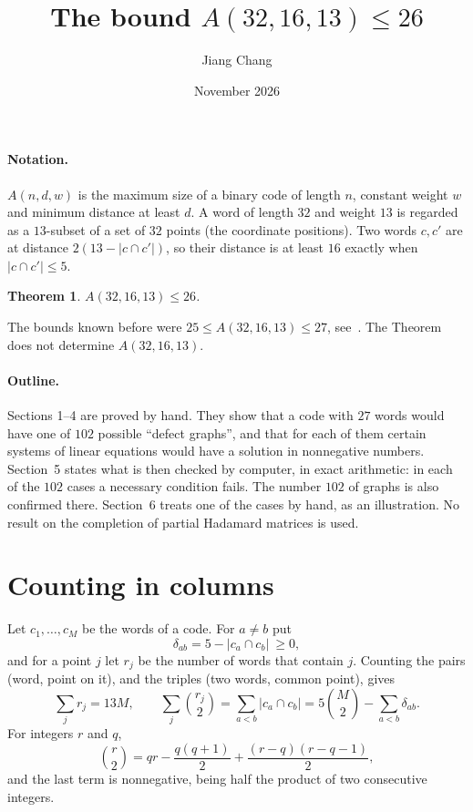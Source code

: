 \documentclass[11pt,a4paper]{article}
\title{\large\bfseries The bound $A(32,16,13)\le 26$}
\author{Jiang Chang}
\date{November 2026}
\newtheorem*{theorem}{Theorem}
\newcommand{\abs}[1]{\lvert #1\rvert}
\begin{document}
\maketitle

\paragraph{Notation.}
$A(n,d,w)$ is the maximum size of a binary code of length $n$, constant
weight $w$ and minimum distance at least $d$. A word of length $32$ and
weight $13$ is regarded as a $13$-subset of a set of $32$ points (the
coordinate positions). Two words $c,c'$ are at distance
$2(13-\abs{c\cap c'})$, so their distance is at least $16$ exactly when
$\abs{c\cap c'}\le 5$.

\begin{theorem}
$A(32,16,13)\le 26$.
\end{theorem}

The bounds known before were $25\le A(32,16,13)\le 27$, see~\cite{Btab}.
The Theorem does not determine $A(32,16,13)$.

\paragraph{Outline.}
Sections 1--4 are proved by hand. They show that a code with $27$ words
would have one of $102$ possible ``defect graphs'', and that for each of
them certain systems of linear equations would have a solution in
nonnegative numbers. Section~5 states what is then checked by computer, in
exact arithmetic: in each of the $102$ cases a necessary condition fails.
The number $102$ of graphs is also confirmed there.
Section~6 treats one of the cases by hand, as an illustration. No result on
the completion of partial Hadamard matrices is used.

\section{Counting in columns}

Let $c_1,\dots,c_M$ be the words of a code. For $a\ne b$ put
\[
\delta_{ab}=5-\abs{c_a\cap c_b}\ \ge 0 ,
\]
and for a point $j$ let $r_j$ be the number of words that contain $j$.
Counting the pairs (word, point on it), and the triples (two words, common
point), gives
\begin{equation}
\sum_j r_j=13M,\qquad
\sum_j\binom{r_j}{2}=\sum_{a<b}\abs{c_a\cap c_b}
 =5\binom M2-\sum_{a<b}\delta_{ab}. \tag{1}
\end{equation}
For integers $r$ and $q$,
\begin{equation}
\binom r2=qr-\frac{q(q+1)}2+\frac{(r-q)(r-q-1)}2 ,\tag{2}
\end{equation}
and the last term is nonnegative, being half the product of two consecutive
integers.
\end{document}
